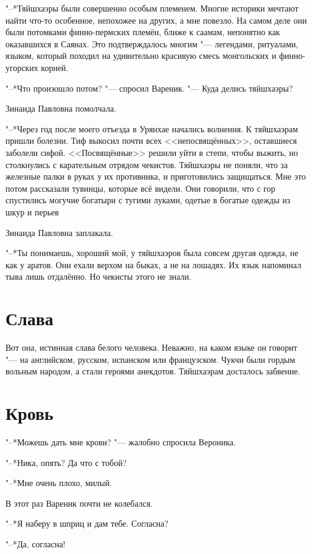 "--*Тяйшхаэры были совершенно особым племенем.
Многие историки мечтают найти что-то особенное, непохожее на других, а мне повезло.
На самом деле они были потомками финно-пермских племён, ближе к саамам, непонятно как оказавшихся в Саянах.
Это подтверждалось многим "--- легендами, ритуалами, языком, который походил на удивительно красивую смесь монгольских и финно-угорских корней.

"--*Что произошло потом? "--- спросил Вареник.
"--- Куда делись тяйшхаэры?

Зинаида Павловна помолчала.

"--*Через год после моего отъезда в Урянхае начались волнения.
К тяйшхаэрам пришли болезни.
Тиф выкосил почти всех <<непосвящённых>>, оставшиеся заболели сифой.
<<Посвящённые>> решили уйти в степи, чтобы выжить, но столкнулись с карательным отрядом чекистов.
Тяйшхаэры не поняли, что за железные палки в руках у их противника, и приготовились защищаться.
Мне это потом рассказали тувинцы, которые всё видели.
Они говорили, что с гор спустились могучие богатыри с тугими луками, одетые в богатые одежды из шкур и перьев\ldotst

Зинаида Павловна заплакала.

"--*Ты понимаешь, хороший мой, у тяйшхаэров была совсем другая одежда, не как у аратов.
Они ехали верхом на быках, а не на лошадях.
Их язык напоминал тыва лишь отдалённо.
Но чекисты этого не знали.

\section{Слава}

Вот она, истинная слава белого человека.
Неважно, на каком языке он говорит "--- на английском, русском, испанском или французском.
Чукчи были гордым вольным народом, а стали героями анекдотов.
Тяйшхаэрам досталось забвение.

\section{Кровь}

"--*Можешь дать мне крови? "--- жалобно спросила Вероника.

"--*Ника, опять?
Да что с тобой?

"--*Мне очень плохо, милый.

В этот раз Вареник почти не колебался.

"--*Я наберу в шприц и дам тебе.
Согласна?

"--*Да, согласна!

